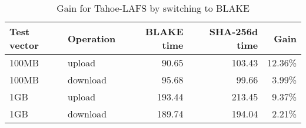 \begin{table}
  \centering
  \caption{Gain for Tahoe-LAFS by switching to BLAKE}
  \begin{tabular}{ | l | l | r | r | r |}
    \hline
    \textbf{Test vector} & \textbf{Operation} & \textbf{BLAKE time} & \textbf{SHA-256d time} & \textbf{Gain} \\ \hline
    100MB  &  upload    &  90.65   &  103.43 &  12.36\% \\  \hline %
    100MB  &  download  &  95.68   &  99.66  &  3.99\%  \\  \hline %
    1GB    &  upload    &  193.44  &  213.45 &  9.37\%  \\  \hline %
    1GB    &  download  &  189.74  &  194.04 &  2.21\%  \\  \hline %
  \end{tabular}
  \label{tbl:tahoe:gain}
\end{table}

